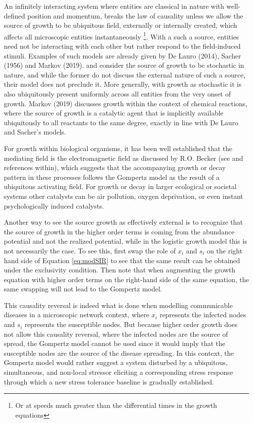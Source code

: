 \documentclass{article}
\begin{document}
An infinitely interacting system where entities are classical in nature with well-defined position and momentum, breaks the law of causality unless we allow the source of growth to be ubiquitous field, externally or internally created, which affects all microscopic entities instantaneously \footnote{Or at speeds much greater than the differential times in the growth equations}. With a such a source, entities need not be interacting with each other but rather respond to the field-induced stimuli. Examples of such models are already given by De Lauro (2014), Sacher (1956) and Markov (2019). \citet{de2014stochastic} and \citet{sacher1956statistical} consider the source of growth to be stochastic in nature, and while the former do not discuss the external nature of such a source, their model does not preclude it. More generally, with growth as stochastic it is also ubiquitously present uniformly across all entities from the very onset of growth. Markov (2019)\cite{markov2019reaction} discusses growth within the context of chemical reactions, where the source of growth is a catalytic agent that is implicitly available ubiquitously to all reactants to the same degree, exactly in line with De Lauro and Sacher's models. 

For growth within biological organisms, it has been well established that the mediating field is the electromagnetic field as discussed by R.O. Becker (see \citet{becker1984electromagnetic} and references within), which suggests that the accompanying growth or decay pattern in these processes follows the Gompertz model as the result of a ubiquitous activating field. For growth or decay in larger ecological or societal systems other catalysts can be air pollution, oxygen deprivation, or even instant psychologically induced catalysts. 

Another way to see the source growth as effectively external is to recognize that the source of growth in the higher order terms is coming from the abundance potential and not the realized potential, while in the logistic growth model this is not necessarily the case. To see this, first swap the role of $x_i$ and $s_i$ on the right hand side of Equation \ref{eq:modSIR} to see that the same result can be obtained under the exclusivity condition. Then note that when augmenting the growth equation with higher order terms on the right-hand side of the same equation, the same swapping will not lead to the Gompertz model. 

This causality reversal is indeed what is done when modelling communicable diseases in a microscopic network context, where $x_i$ represents the infected nodes and $s_i$ represents the susceptible nodes. But because higher order growth does not allow this causality reversal, where the infected nodes are the source of spread, the Gompertz model cannot be used since it would imply that the susceptible nodes are the source of the disease spreading. In this context, the Gompertz model would rather suggest a system disturbed by a ubiquitous, simultaneous, and non-local stressor eliciting a corresponding stress response through which a new stress tolerance baseline is gradually established.
\end{document}
